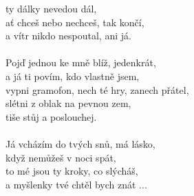 \begin{multicols}{2}
ty dálky nevedou dál,\\
ať chceš nebo nechceš, tak končí,\\
a vítr nikdo nespoutal, ani já.\\
\\
Pojď jednou ke mně blíž, jedenkrát,\\
a já ti povím, kdo vlastně jsem,\\
vypni gramofon, nech té hry, zanech přátel,\\
slétni z oblak na pevnou zem,\\
tiše stůj a poslouchej.\\
\\
Já vcházím do tvých snů, má lásko,\\
když nemůžeš v noci spát,\\
to mé jsou ty kroky, co slýcháš,\\
a myšlenky tvé chtěl bych znát ...
\end{multicols}